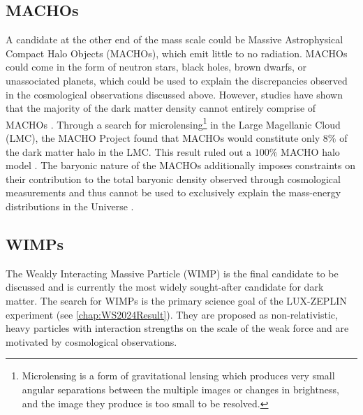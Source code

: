 \subsection{MACHOs}\label{sec:DMOverview/MACHOs}
A candidate at the other end of the mass scale could be Massive Astrophysical Compact Halo Objects (MACHOs), which emit little to no radiation. MACHOs could come in the form of neutron stars, black
holes, brown dwarfs, or unassociated planets, which could be used to explain the discrepancies observed in the cosmological observations discussed above. However, studies have shown that the majority of the dark matter density cannot entirely comprise of MACHOs \cite{Becker:2004ni,MicroLens}. Through a search for microlensing\footnote{Microlensing is a form of gravitational lensing which produces very small angular separations between the multiple images or changes in brightness, and the image they produce is too small to be resolved.} in the Large Magellanic Cloud (LMC), the MACHO Project found that MACHOs would constitute only $8\%$ of the dark matter halo in the LMC. This result ruled out a $100\%$ MACHO halo model \cite{MicroLens}.
The baryonic nature of the MACHOs additionally imposes constraints on their contribution to the total baryonic density observed through cosmological measurements and thus cannot be used to exclusively explain the mass-energy distributions in the Universe \cite{Planck2018}.

\subsection{WIMPs}\label{sec:DMOverview/WIMPs}
The Weakly Interacting Massive Particle (WIMP) is the final candidate to be discussed and is currently the most widely sought-after candidate for dark matter. The search for WIMPs is the primary science goal of the LUX-ZEPLIN experiment (see \autoref{chap:WS2024Result}). They are proposed as non-relativistic, heavy particles with interaction strengths on the scale of the weak force and are motivated by cosmological observations.


